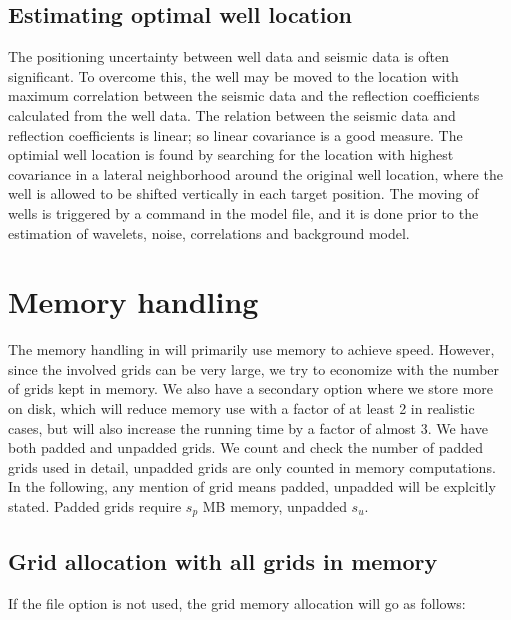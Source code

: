 \subsection{Estimating optimal well location}
The positioning uncertainty between well data and seismic data is often significant. To overcome this, the well may be moved to the location with maximum correlation between the seismic data and the reflection coefficients calculated from the well data. The relation between the seismic data and reflection coefficients is linear; so linear covariance is a good measure. The optimial well location is found by searching for the location with highest covariance in a lateral neighborhood around the original well location, where the well is allowed to be shifted vertically in each target position. The moving of wells is triggered by a command in the model file, and it is done prior to the estimation of wavelets, noise, correlations and background model.

\section{Memory handling}
The memory handling in \crava will primarily use memory to achieve speed. However, since the involved grids can be very large, we try to economize with the number of grids kept in memory. We also have a secondary option where we store more on disk, which will reduce memory use with a factor of at least 2 in realistic cases, but will also increase the running time by a factor of almost 3. We have both padded and unpadded grids. We count and check the number of padded grids used in detail, unpadded grids are only counted in memory computations. In the following, any mention of grid means padded, unpadded will be explcitly stated. Padded grids require $s_p$ MB memory, unpadded $s_u$.

\subsection{Grid allocation with all grids in memory}
 If the file option is not used, the grid memory allocation will go as follows:

